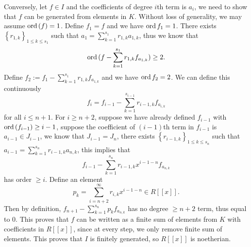 \documentclass[letterpaper, 12pt]{article}
\begin{document}
\begin{solution}
Conversely, let \(f\in I\) and the coefficients of degree \(i\)th term is \(a_i\), we need to show that \(f\) can be generated from elements in \(K\). Without loss of generality, we may assume \(\text{ord}\,(f)=1\). Define \(f_1=f\) and we have \(\text{ord}\, f_1=1\). There exists \(\left\{ r_{1,k}\right\}_{1\leq k\leq s_1}\) such that \(a_1=\sum_{k=1}^{s_1}r_{1,k}a_{1,k}\), thus we know that 
\[\text{ord}\,(f-\sum_{k=1}^{s_1}r_{1,k}f_{a_{1,k}})\geq 2.\]
Define \(f_2:=f_1-\sum_{k=1}^{s_1}r_{1,k}f_{a_{1,k}}\) and we have \(\text{ord}\, f_2=2\). We can define this continuously
\[f_i=f_{i-1}-\sum_{k=1}^{s_{i-1}}r_{i-1,k}f_{a_{i,k}}\]
for all \(i\leq n+1\). For \(i\geq n+2\), suppose we have already defined \(f_{i-1}\) with \(\text{ord}\,(f_{i-1})\geq i-1\), suppose the coefficient of \((i-1)\)th term in \(f_{i-1}\) is \(a_{i-1}\in J_{i-1}\), we know that \(J_{i-1}=J_n\), there exists \(\left\{ r_{i-1,k} \right\}_{1\leq k\leq s_n} \) such that \(a_{i-1}=\sum_{k=1}^{s_n}r_{i-1,k}a_{n,k}\), this implies that 
\[f_{i-1}-\sum_{k=1}^{s_n}r_{i-1,k}x^{i-1-n}f_{a_{n,k}}\]
has order \(\geq i\). Define an element 
\[p_k=\sum_{i=n+2}^{\infty}r_{i,k}x^{i-1-n}\in R[[x]].\]
Then by definition, \(f_{n+1}-\sum_{k=1}^{s_n}p_kf_{a_{n,k}}\) has no degree \(\geq n+2\) term, thus equal to \(0\). This proves that \(f\) can be written as a finite sum of elements from \(K\) with coefficients in \(R[[x]]\), since at every step, we only remove finite sum of elements. This proves that \(I\) is finitely generated, so \(R[[x]]\) is noetherian. 
\end{solution}
\end{document}

